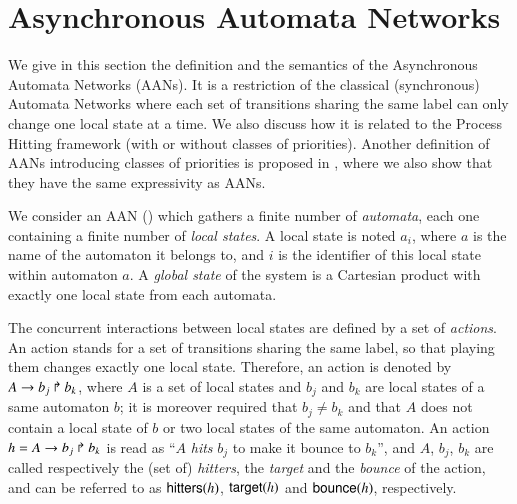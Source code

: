 \section{Asynchronous Automata Networks}
\label{sec:ph}

We give in this section the definition and the semantics of the Asynchronous Automata Networks (AANs).
It is a restriction of the classical (synchronous) Automata Networks
where each set of transitions sharing the same label
can only change one local state at a time.
We also discuss how it is related to the Process Hitting framework
(with or without classes of priorities).
Another definition of AANs introducing classes of priorities
is proposed in ,
where we also show that they have the same expressivity as AANs.

\medskip



We consider an AAN ()
which gathers a finite number of \emph{automata},
each one containing a finite number of \emph{local states}.
A local state is noted $a_i$, where $a$ is the name of the automaton it belongs to,
and $i$ is the identifier of this local state within automaton $a$.
A \emph{global state} of the system is a Cartesian product
with exactly one local state from each automata.

The concurrent interactions between local states are defined by a set of \emph{actions}.
An action stands for a set of transitions sharing the same label,
so that playing them changes exactly one local state.
Therefore, an action is denoted by $A\rightarrow b_j\Rsh b_k$,
where $A$ is a set of local states
and $b_j$ and $b_k$ are local states of a same automaton $b$;
it is moreover required that $b_j \neq b_k$ and that
$A$ does not contain a local state of $b$ or two local states of the same automaton.
An action $h=A\rightarrow b_j\Rsh b_k$ is read as
``$A$ \emph{hits} $b_j$ to make it bounce to $b_k$'',
and $A$, $b_j$, $b_k$ are called respectively the (set of)
\emph{hitters}, the \emph{target} and the \emph{bounce} of the action,
and can be referred to as $\mathsf{hitters}(h)$, $\mathsf{target}(h)$ and $\mathsf{bounce}(h)$, respectively.

